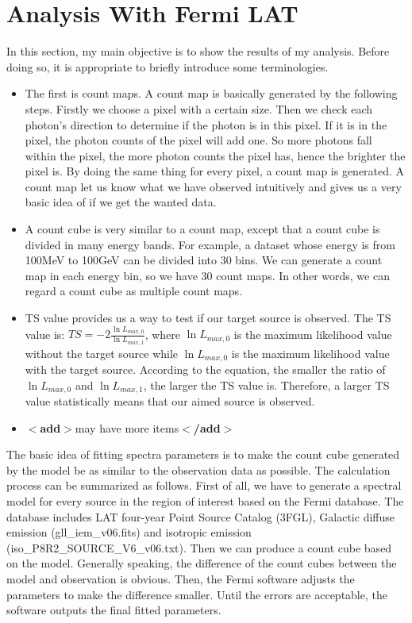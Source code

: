 \documentclass[12pt]{report}
\newcommand{\add}[1]{
  $<$\textbf{add}$>$#1$<$\textbf{/add}$>$
}
\begin{document}
      \section{Analysis With Fermi LAT}
        In this section, my main objective is to show the results of my analysis. Before doing so, it is 
        appropriate to briefly introduce some terminologies. 
        \begin{itemize}
          \item The first is count maps. A count map is basically generated by the following steps. Firstly we choose a 
            pixel with a certain size. Then we check each photon's direction to determine if the photon is in this 
            pixel. If it is in the pixel, the photon counts of the pixel will add one. So more photons fall within 
            the pixel, the more photon counts the pixel has, hence the brighter the pixel is. By doing the same thing 
            for every pixel, a count map is generated. A count map let us know what we have observed intuitively and 
            gives us a very basic idea of if we get the wanted data. 
          \item A count cube is very similar to a count map, except that a count cube is divided in many energy
            bands. For example, a dataset whose energy is from 100MeV to 100GeV can be divided into 30 bins. We can
            generate a count map in each energy bin, so we have 30 count maps. In other words, we can regard a 
            count cube as multiple count maps. 
          \item TS value provides us a way to test if our target source is observed. The TS value is: 
            $TS = -2 \frac{\ln{L_{max, 0}}}{\ln{L_{max, 1}}}$, where $\ln{L_{max, 0}}$ is the maximum likelihood value 
            without the target source while $\ln{L_{max, 0}}$ is the maximum likelihood value with the target source.
            According to the equation, the smaller the ratio of $\ln{L_{max, 0}}$ and $\ln{L_{max, 1}}$, the larger
            the TS value is. Therefore, a larger TS value statistically means that our aimed source is observed. 
          \item \add{may have more items}
        \end{itemize}

        The basic idea of fitting spectra parameters is to make the count cube generated by the model be as similar 
        to the observation data as possible. The calculation process can be summarized as follows. First of all, we 
        have to generate a spectral model for every source in the region of interest based on the Fermi database.
        The database includes LAT four-year Point Source Catalog (3FGL), Galactic diffuse emission (gll\_iem\_v06.fits)
        and isotropic emission (iso\_P8R2\_SOURCE\_V6\_v06.txt). 
        Then we can produce a count cube based on the model. Generally speaking, the difference of the 
        count cubes between the model and observation is obvious. Then, the Fermi software adjusts the parameters 
        to make the difference smaller. Until the errors are acceptable, the software outputs the final fitted 
        parameters. 
\end{document}
